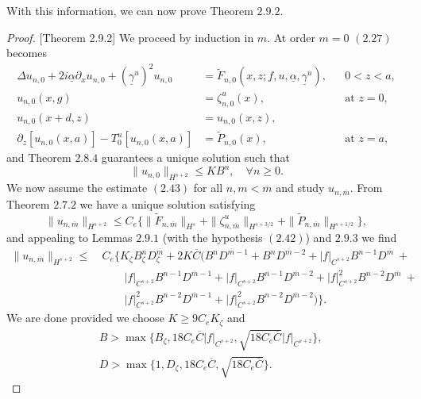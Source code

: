 \begin{flushleft}
 With this information, we can now prove Theorem $2.9.2$.
 \end{flushleft}
 \vskip 0.1in
\begin{proof}{[Theorem 2.9.2]} We proceed by induction in $m$. At order $m=0$ $(2.27)$ becomes
\begin{subequations}
\begin{align}
\Delta u_{n,0} +2i\underline{\alpha}\partial_{x}u_{n,0}+(\underline{\gamma}^u)^2u_{n,0}&=\tilde{F}_{n,0}\left(x,z;f,u,\underline{\alpha},\underline{\gamma}^u\right),&&\text{$0<z<a$}, \\
u_{n,0}(x,g)&=\zeta^u_{n,0}(x),&& \text{at $z=0$},\\
u_{n,0}(x+d,z)&=u_{n,0}(x,z), \\
\partial_z \left[u_{n,0}(x,a)\right] - T_0^u[u_{n,0}(x,a)]&=\tilde{P}_{n,0}(x),&& \text{at $z=a$},
\end{align}
\end{subequations}
and Theorem $2.8.4$ guarantees a unique solution such that 
$$\|u_{n,0}\|_{H^{s+2}}\le KB^n,\quad \text{$\forall n\ge 0$}.  $$
We now assume the estimate $(2.43)$ for all $n, m < \overline{m}$ and study $u_{n,\overline{m}}$. From Theorem $2.7.2$ we have a unique solution satisfying 
$$\|u_{n,\overline{m}}\|_{H^{s+2}}\le C_e\{\|\tilde{F}_{n,\overline{m}}\|_{H^{s}}+\|\zeta^u_{n,\overline{m}}\|_{H^{s+3/2}}+\|\tilde{P}_{n,\overline{m}}\|_{H^{s+1/2}}  \}, $$
and appealing to Lemmas $2.9.1$ (with the hypothesis $(2.42)$)  and $2.9.3$ we find
\begin{align*}
\|u_{n,\overline{m}}\|_{H^{s+2}}\le & ~ C_e\Bigg\{K_{\zeta}B_{\zeta}^{n}D_{\zeta}^{\overline{m}} + 2K\overline{C}\bigg(B^nD^{\overline{m}-1}+B^nD^{\overline{m}-2} + |f|_{C^{s+2}}B^{n-1}D^{\overline{m}} ~+\nonumber\\&~\qquad
|f|_{C^{s+2}}B^{n-1}D^{\overline{m}-1} +  |f|_{C^{s+2}}B^{n-1}D^{\overline{m}-2} +
  |f|_{C^{s+2}}^2B^{n-2}D^{\overline{m}} ~+ \nonumber\\&~\qquad
|f|_{C^{s+2}}^2B^{n-2}D^{\overline{m}-1} +
|f|_{C^{s+2}}^2B^{n-2}D^{\overline{m}-2}
\bigg)\Bigg\}.
\end{align*}
We are done provided we choose $K \ge 9C_eK_{\zeta}$ and
\begin{align*}&B  > \max\Big\{B_{\zeta},18C_e\overline{C}|f|_{C^{s+2}},\sqrt{18C_e\overline{C}}|f|_{C^{s+2}}\Big\},\\&
D  > \max\Big\{1,D_{\zeta},18C_e\overline{C},\sqrt{18C_e\overline{C}} \Big\}.
\end{align*}
\end{proof}